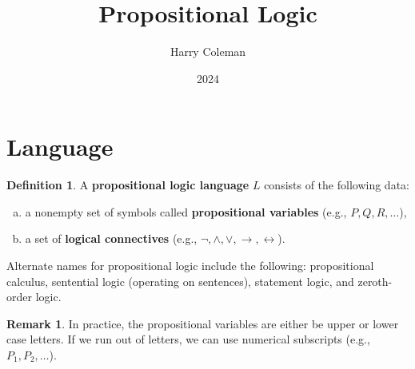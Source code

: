 \documentclass[12pt]{article}
\renewcommand{\maketitle}{\thispagestyle{title}}
\theoremstyle{definition}
\newtheorem{definition}[theorem]{Definition}
\newtheorem{remark}[theorem]{Remark}
\newcommand{\<}{\langle}
\renewcommand{\>}{\rangle}
\newcommand{\keyword}{\textbf}
\begin{document}
\title{Propositional Logic}
\author{Harry Coleman}
\date{2024}
\maketitle

\section{Language}

\begin{definition}
    A \keyword{propositional logic language} $L$ consists of the following data:
    \begin{enumerate}[(a)]
        \item a nonempty set of symbols called \keyword{propositional variables} (e.g., $P, Q, R, \dots$),
        \item a set of \keyword{logical connectives} (e.g., $\lnot, \land, \lor, \to, \leftrightarrow$).
    \end{enumerate}
    Alternate names for propositional logic include the following: propositional calculus, sentential logic (operating on sentences), statement logic, and zeroth-order logic.
\end{definition}

\begin{remark}
    In practice, the propositional variables are either be upper or lower case letters.
    If we run out of letters, we can use numerical subscripts (e.g., $P_1, P_2, \dots$).
\end{remark}
\end{document}
